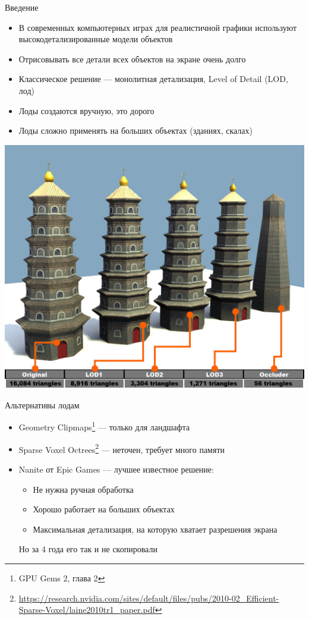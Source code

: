 \begin{frame}{Введение}
    \begin{itemize}
        \item В современных компьютерных играх для реалистичной графики используют высокодетализированные модели объектов
        \item Отрисовывать все детали всех объектов на экране очень долго
        \item Классическое решение --- монолитная детализация, Level of Detail (LOD, лод)
        \item Лоды создаются вручную, это дорого
        \item Лоды сложно применять на больших объектах (зданиях, скалах)
    \end{itemize}
    \begin{center}
        \includegraphics[height=.4\textheight]{lod.jpg}
    \end{center}
\end{frame}

\begin{frame}{Альтернативы лодам}
    \begin{itemize}
        \item Geometry Clipmaps\footnote{GPU Gems 2, глава 2} --- только для ландшафта
        \item Sparse Voxel Octrees\footnote{\url{https://research.nvidia.com/sites/default/files/pubs/2010-02_Efficient-Sparse-Voxel/laine2010tr1_paper.pdf}} --- неточен, требует много памяти
        \item Nanite от Epic Games --- лучшее известное решение:
        \begin{itemize}
            \item Не нужна ручная обработка
            \item Хорошо работает на больших объектах
            \item Максимальная детализация, на которую хватает разрешения экрана
        \end{itemize}

        \alert{Но за 4 года его так и не скопировали}
    \end{itemize}
\end{frame}

